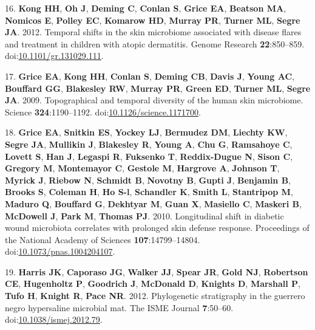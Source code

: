 \documentclass[11pt,]{article}
\begin{document}
\hypertarget{ref-Kongux5f2012}{}
16. \textbf{Kong HH}, \textbf{Oh J}, \textbf{Deming C}, \textbf{Conlan
S}, \textbf{Grice EA}, \textbf{Beatson MA}, \textbf{Nomicos E},
\textbf{Polley EC}, \textbf{Komarow HD}, \textbf{Murray PR},
\textbf{Turner ML}, \textbf{Segre JA}. 2012. Temporal shifts in the skin
microbiome associated with disease flares and treatment in children with
atopic dermatitis. Genome Research \textbf{22}:850--859.
doi:\href{https://doi.org/10.1101/gr.131029.111}{10.1101/gr.131029.111}.

\hypertarget{ref-Griceux5f2009}{}
17. \textbf{Grice EA}, \textbf{Kong HH}, \textbf{Conlan S},
\textbf{Deming CB}, \textbf{Davis J}, \textbf{Young AC},
\textbf{Bouffard GG}, \textbf{Blakesley RW}, \textbf{Murray PR},
\textbf{Green ED}, \textbf{Turner ML}, \textbf{Segre JA}. 2009.
Topographical and temporal diversity of the human skin microbiome.
Science \textbf{324}:1190--1192.
doi:\href{https://doi.org/10.1126/science.1171700}{10.1126/science.1171700}.

\hypertarget{ref-Griceux5f2010}{}
18. \textbf{Grice EA}, \textbf{Snitkin ES}, \textbf{Yockey LJ},
\textbf{Bermudez DM}, \textbf{Liechty KW}, \textbf{Segre JA},
\textbf{Mullikin J}, \textbf{Blakesley R}, \textbf{Young A}, \textbf{Chu
G}, \textbf{Ramsahoye C}, \textbf{Lovett S}, \textbf{Han J},
\textbf{Legaspi R}, \textbf{Fuksenko T}, \textbf{Reddix-Dugue N},
\textbf{Sison C}, \textbf{Gregory M}, \textbf{Montemayor C},
\textbf{Gestole M}, \textbf{Hargrove A}, \textbf{Johnson T},
\textbf{Myrick J}, \textbf{Riebow N}, \textbf{Schmidt B},
\textbf{Novotny B}, \textbf{Gupti J}, \textbf{Benjamin B},
\textbf{Brooks S}, \textbf{Coleman H}, \textbf{Ho S-l},
\textbf{Schandler K}, \textbf{Smith L}, \textbf{Stantripop M},
\textbf{Maduro Q}, \textbf{Bouffard G}, \textbf{Dekhtyar M},
\textbf{Guan X}, \textbf{Masiello C}, \textbf{Maskeri B},
\textbf{McDowell J}, \textbf{Park M}, \textbf{Thomas PJ}. 2010.
Longitudinal shift in diabetic wound microbiota correlates with
prolonged skin defense response. Proceedings of the National Academy of
Sciences \textbf{107}:14799--14804.
doi:\href{https://doi.org/10.1073/pnas.1004204107}{10.1073/pnas.1004204107}.

\hypertarget{ref-Kirkux5fHarrisux5f2012}{}
19. \textbf{Harris JK}, \textbf{Caporaso JG}, \textbf{Walker JJ},
\textbf{Spear JR}, \textbf{Gold NJ}, \textbf{Robertson CE},
\textbf{Hugenholtz P}, \textbf{Goodrich J}, \textbf{McDonald D},
\textbf{Knights D}, \textbf{Marshall P}, \textbf{Tufo H}, \textbf{Knight
R}, \textbf{Pace NR}. 2012. Phylogenetic stratigraphy in the guerrero
negro hypersaline microbial mat. The ISME Journal \textbf{7}:50--60.
doi:\href{https://doi.org/10.1038/ismej.2012.79}{10.1038/ismej.2012.79}.
\end{document}
